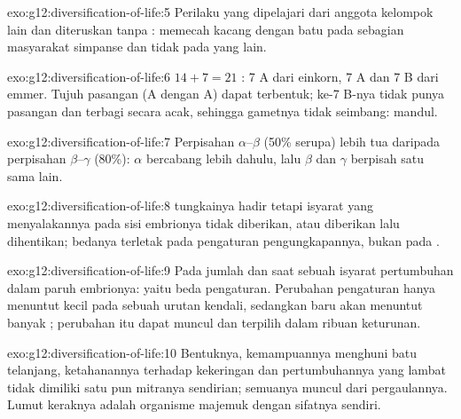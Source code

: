 \begin{solution}{exo:g12:diversification-of-life:5}
Perilaku yang dipelajari dari anggota kelompok lain dan diteruskan
tanpa : memecah kacang dengan batu pada sebagian masyarakat simpanse
dan tidak pada yang lain.
\end{solution}

\begin{solution}{exo:g12:diversification-of-life:6}
$14 + 7 = 21$ : 7 A dari einkorn, 7 A dan 7 B dari emmer. Tujuh
pasangan (A dengan A) dapat terbentuk; ke-7  B-nya tidak punya
pasangan dan terbagi secara acak, sehingga gametnya tidak seimbang:
mandul.
\end{solution}

\begin{solution}{exo:g12:diversification-of-life:7}
Perpisahan $\alpha$--$\beta$ (50\% serupa) lebih tua daripada
perpisahan $\beta$--$\gamma$ (80\%): $\alpha$ bercabang lebih dahulu,
lalu $\beta$ dan $\gamma$ berpisah satu sama lain.
\end{solution}

\begin{solution}{exo:g12:diversification-of-life:8}
 tungkainya hadir tetapi isyarat yang menyalakannya pada sisi
embrionya tidak diberikan, atau diberikan lalu dihentikan; bedanya
terletak pada pengaturan pengungkapannya, bukan pada .
\end{solution}

\begin{solution}{exo:g12:diversification-of-life:9}
Pada jumlah dan saat sebuah isyarat pertumbuhan dalam paruh embrionya:
yaitu beda pengaturan. Perubahan pengaturan hanya menuntut  kecil
pada sebuah urutan kendali, sedangkan  baru akan menuntut banyak
; perubahan itu dapat muncul dan terpilih dalam ribuan keturunan.
\end{solution}

\begin{solution}{exo:g12:diversification-of-life:10}
Bentuknya, kemampuannya menghuni batu telanjang, ketahanannya terhadap
kekeringan dan pertumbuhannya yang lambat tidak dimiliki satu pun
mitranya sendirian; semuanya muncul dari pergaulannya. Lumut keraknya
adalah organisme majemuk dengan sifatnya sendiri.
\end{solution}

